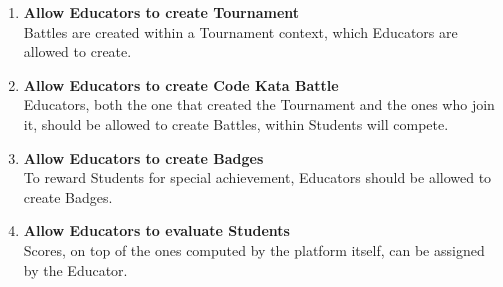 \begin{enumerate}[label=$\bullet$ \textbf{GE\arabic*:}]
    \item \textbf{Allow Educators to create Tournament}\\Battles are created within a Tournament context, which Educators are allowed to create.
    \item \textbf{Allow Educators to create Code Kata Battle}\\Educators, both the one that created the Tournament and the ones who join it, should be allowed to create Battles, within Students will compete.
    \item \textbf{Allow Educators to create Badges}\\To reward Students for special achievement, Educators should be allowed to create Badges.
    \item \textbf{Allow Educators to evaluate Students}\\Scores, on top of the ones computed by the platform itself, can be assigned by the Educator.
\end{enumerate}
